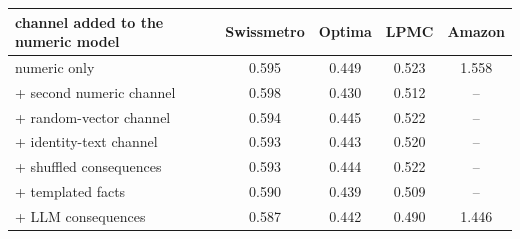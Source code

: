 \begin{tabular}{lcccc}
\toprule
channel added to the numeric model & Swissmetro & Optima & LPMC & Amazon \\
\midrule
numeric only & 0.595 & 0.449 & 0.523 & 1.558 \\
\quad + second numeric channel & 0.598 & 0.430 & 0.512 & -- \\
\quad + random-vector channel & 0.594 & 0.445 & 0.522 & -- \\
\quad + identity-text channel & 0.593 & 0.443 & 0.520 & -- \\
\quad + shuffled consequences & 0.593 & 0.444 & 0.522 & -- \\
\quad + templated facts & 0.590 & 0.439 & 0.509 & -- \\
\quad + LLM consequences & 0.587 & 0.442 & 0.490 & 1.446 \\
\bottomrule
\end{tabular}